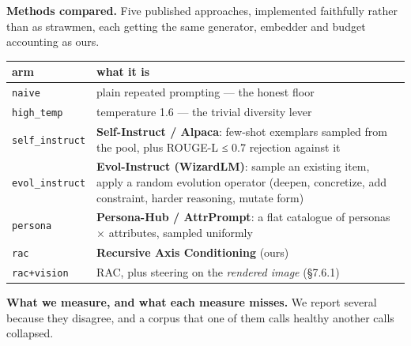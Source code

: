 \documentclass[
  10pt,
]{article}
\theoremstyle{plain}
\theoremstyle{definition}
\begin{document}
\textbf{Methods compared.} Five published approaches, implemented
faithfully rather than as strawmen, each getting the same generator,
embedder and budget accounting as ours.

{\footnotesize
\begin{longtable}[]{@{}>{\raggedright\arraybackslash}p{}>{\raggedright\arraybackslash}p{}@{}}
\toprule\noalign{}
arm & what it is \\
\midrule\noalign{}
\endhead
\bottomrule\noalign{}
\endlastfoot
\texttt{naive} & plain repeated prompting --- the honest floor \\
\texttt{high\_temp} & temperature 1.6 --- the trivial diversity lever \\
\texttt{self\_instruct} & \textbf{Self-Instruct / Alpaca}: few-shot
exemplars sampled from the pool, plus ROUGE-L ≤ 0.7 rejection against
it \\
\texttt{evol\_instruct} & \textbf{Evol-Instruct (WizardLM)}: sample an
existing item, apply a random evolution operator (deepen, concretize,
add constraint, harder reasoning, mutate form) \\
\texttt{persona} & \textbf{Persona-Hub / AttrPrompt}: a flat catalogue
of personas × attributes, sampled uniformly \\
\texttt{rac} & \textbf{Recursive Axis Conditioning} (ours) \\
\texttt{rac+vision} & RAC, plus steering on the \emph{rendered image}
(§7.6.1) \\
\end{longtable}}

\textbf{What we measure, and what each measure misses.} We report
several because they disagree, and a corpus that one of them calls
healthy another calls collapsed.
\end{document}
